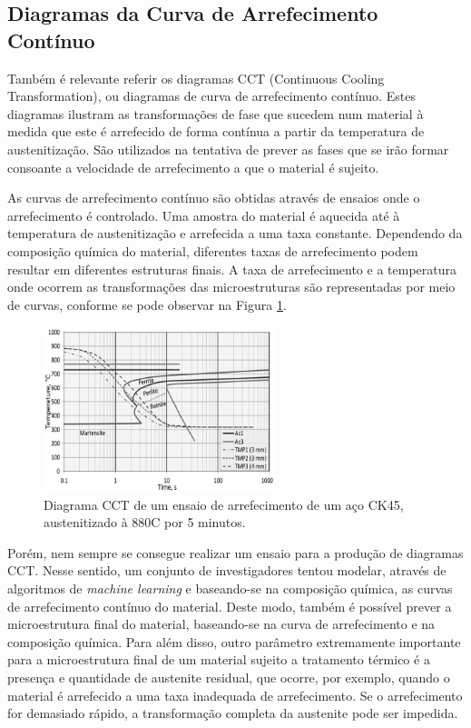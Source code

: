 \newpage
\subsection{Diagramas da Curva de Arrefecimento Contínuo}\label{ssec:diagramas_CCT}
Também é relevante referir os diagramas CCT (Continuous Cooling Transformation), ou diagramas de curva de arrefecimento contínuo. Estes diagramas ilustram as transformações de fase que sucedem num material à medida que este é arrefecido de forma contínua a partir da temperatura de austenitização. São utilizados na tentativa de prever as fases que se irão formar consoante a velocidade de arrefecimento a que o material é sujeito.
\par
As curvas de arrefecimento contínuo são obtidas através de ensaios onde o arrefecimento é controlado. Uma amostra do material é aquecida até à temperatura de austenitização e arrefecida a uma taxa constante. Dependendo da composição química do material, diferentes taxas de arrefecimento podem resultar em diferentes estruturas finais. A taxa de arrefecimento e a temperatura onde ocorrem as transformações das microestruturas são representadas por meio de curvas, conforme se pode observar na Figura \ref{fig:CCT_SOA}.
\begin{figure}[htb]
    \centering
    \includegraphics[width = 0.6\textwidth]{Figures/Cap2/CCT_SOA.png}
    \caption[Diagrama CCT de um aço CK45]%
    {Diagrama CCT de um ensaio de arrefecimento de um aço CK45, austenitizado à 880\textdegree C por 5 minutos\cite{Karli2016}.}
    \label{fig:CCT_SOA}
\end{figure}
\par
Porém, nem sempre se consegue realizar um ensaio para a produção de diagramas CCT. Nesse sentido, um conjunto de investigadores tentou modelar, através de algoritmos de \textit{machine learning} e baseando-se na composição química, as curvas de arrefecimento contínuo do material\cite{Martin2020}. Deste modo, também é possível prever a microestrutura final do material, baseando-se na curva de arrefecimento e na composição química. Para além disso, outro parâmetro extremamente importante para a microestrutura final de um material sujeito a tratamento térmico é a presença e quantidade de austenite residual, que ocorre, por exemplo, quando o material é arrefecido a uma taxa inadequada de arrefecimento. Se o arrefecimento for demasiado rápido, a transformação completa da austenite pode ser impedida.
\newpage
